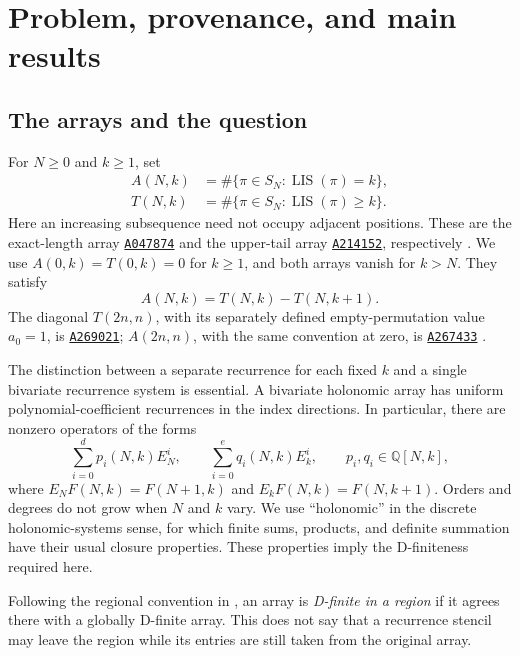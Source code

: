 \documentclass[11pt,letterpaper]{article}
\numberwithin{equation}{section}
\theoremstyle{definition}
\DeclareMathOperator{\LIS}{LIS}
\newcommand{\Q}{\mathbb Q}
\newcommand{\oeis}[1]{\href{https://oeis.org/#1}{\texttt{#1}}}
\begin{document}
\begingroup
\small
\setlength{\parskip}{0pt}
\tableofcontents
\endgroup
\newpage

\section{Problem, provenance, and main results}
\subsection{The arrays and the question}
For $N\ge0$ and $k\ge1$, set
\begin{align}
 A(N,k)&=\#\{\pi\in S_N:\LIS(\pi)=k\},\label{lis:eq:Adef}\\
 T(N,k)&=\#\{\pi\in S_N:\LIS(\pi)\ge k\}.
 \label{lis:eq:Tdef}
\end{align}
Here an increasing subsequence need not occupy adjacent positions. These
are the exact-length array \oeis{A047874} and the upper-tail array
\oeis{A214152}, respectively \cite{oeisA,oeisT}. We use
$A(0,k)=T(0,k)=0$ for $k\ge1$, and both arrays vanish for $k>N$.
They satisfy
\begin{equation}
 A(N,k)=T(N,k)-T(N,k+1).\label{lis:eq:difference}
\end{equation}
The diagonal $T(2n,n)$, with its separately defined empty-permutation value
$a_0=1$, is \oeis{A269021}; $A(2n,n)$, with the same convention at zero,
is \oeis{A267433} \cite{oeis269,oeis267}.

The distinction between a separate recurrence for each fixed $k$ and a
single bivariate recurrence system is essential. A bivariate holonomic
array has uniform polynomial-coefficient recurrences in the index
directions. In particular, there are nonzero operators of the forms
\begin{equation}
 \sum_{i=0}^{d}p_i(N,k)E_N^i,
 \qquad \sum_{i=0}^{e}q_i(N,k)E_k^i,
 \qquad p_i,q_i\in\Q[N,k],\label{lis:eq:pure}
\end{equation}
where $E_NF(N,k)=F(N+1,k)$ and $E_kF(N,k)=F(N,k+1)$.
Orders and degrees do not grow when $N$ and $k$ vary.
We use ``holonomic'' in the discrete holonomic-systems sense, for which
finite sums, products, and definite summation have their usual closure
properties. These properties imply the D-finiteness required here.

Following the regional convention in \cite{KW}, an array is
\emph{D-finite in a region} if it agrees there with a globally D-finite
array. This does not say that a recurrence stencil may leave the region
while its entries are still taken from the original array.
\end{document}
